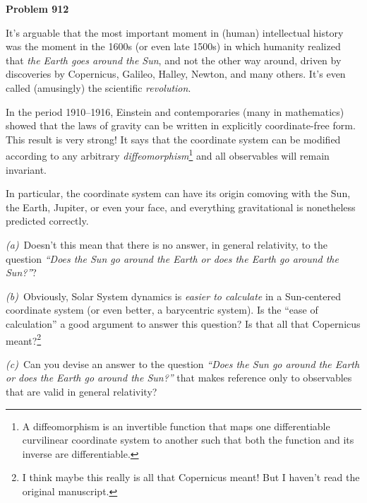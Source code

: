 \documentclass[12pt]{article}
\begin{document}
\begin{pottproblem}
\textbf{Problem 912}

It's arguable that the most important moment in (human) intellectual
history was the moment in the 1600s (or even late 1500s) in which
humanity realized that \emph{the Earth goes around the Sun}, and not
the other way around, driven by discoveries by Copernicus, Galileo,
Halley, Newton, and many others.  It's even called (amusingly) the
scientific \emph{revolution}.

In the period 1910--1916, Einstein and contemporaries (many in
mathematics) showed that the laws of gravity can be written in
explicitly coordinate-free form. This result is very strong! It says
that the coordinate system can be modified according to any arbitrary
\emph{diffeomorphism}\footnote{A diffeomorphism is an invertible
function that maps one differentiable curvilinear coordinate system to
another such that both the function and its inverse are
differentiable.} and all observables will remain invariant.

In particular, the coordinate system can have its origin comoving with
the Sun, the Earth, Jupiter, or even your face, and everything
gravitational is nonetheless predicted correctly.


\textsl{(a)}~Doesn't this mean that there is no answer, in general
relativity, to the question \textsl{``Does the Sun go around the Earth or does
the Earth go around the Sun?''}?

\textsl{(b)}~Obviously, Solar System dynamics is \emph{easier to
calculate} in a Sun-centered coordinate system (or even better, a
barycentric system). Is the ``ease of calculation'' a good argument to
answer this question? Is that all that Copernicus meant?\footnote{I
think maybe this really is all that Copernicus meant! But I haven't
read the original manuscript.}

\textsl{(c)}~Can you devise an answer to the question \textsl{``Does the Sun
go around the Earth or does the Earth go around the Sun?''} that makes
reference only to observables that are valid in general relativity?

\end{pottproblem}
\end{document}
